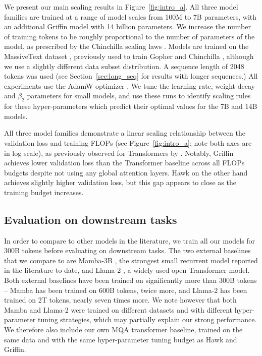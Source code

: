\documentclass[11pt, a4paper, logo, onecolumn]{googledeepmind}
\theoremstyle{definition}
\begin{document}
We present our main scaling results in Figure~\ref{fig:intro_a}. 
All three model families are trained at a range of model scales from 100M to 7B parameters, with an additional Griffin model with 14 billion parameters.
We increase the number of training tokens to be roughly proportional to the number of parameters of the model, as prescribed by the Chinchilla scaling laws \citep{hoffmann2022training}. 
Models are trained on the MassiveText dataset \citep{hoffmann2022training}, previously used to train Gopher \citep{rae2021scaling} and Chinchilla \citep{hoffmann2022training}, although we use a slightly different data subset distribution.
A sequence length of 2048 tokens was used (see Section~\ref{sec:long_seq} for results with longer sequences.) 
All experiments use the AdamW optimizer \citep{loshchilov2017decoupled}. We tune the learning rate, weight decay and $\beta_2$ parameters for small models, and use these runs to identify scaling rules for these hyper-parameters which predict their optimal values for the 7B and 14B models.


All three model families demonstrate a linear scaling relationship between the validation loss and training FLOPs (see Figure~\ref{fig:intro_a}; note both axes are in log scale), as previously observed for Transformers by \citet{brown2020language}. 
Notably, Griffin achieves lower validation loss than the Transformer baseline across all FLOPs budgets despite not using any global attention layers. Hawk on the other hand achieves slightly higher validation loss, but this gap appears to close as the training budget increases. 


\subsection{Evaluation on downstream tasks}
\label{sec:downstream_evals}




In order to compare to other models in the literature, we train all our models for 300B tokens before evaluating on downstream tasks. 
The two external baselines that we compare to are Mamba-3B \citep{gu2023mamba}, the strongest small recurrent model reported in the literature to date, and Llama-2 \citep{touvron2023llama}, a widely used open Transformer model. Both external baselines have been trained on significantly more than 300B tokens -- Mamba has been trained on 600B tokens, twice more, and Llama-2 has been trained on 2T tokens, nearly seven times more. We note however that both Mamba and Llama-2 were trained on different datasets and with different hyper-parameter tuning strategies, which may partially explain our strong performance. We therefore also include our own MQA transformer baseline, trained on the same data and with the same hyper-parameter tuning budget as Hawk and Griffin.
\end{document}
